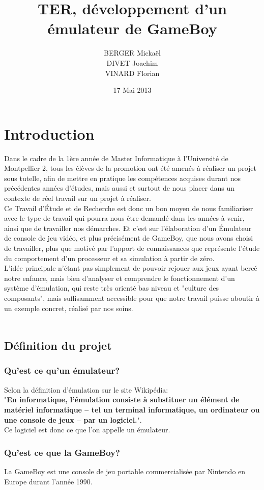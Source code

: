\documentclass{report}
\title{TER, développement d'un émulateur de GameBoy}
\author{BERGER Mickaël \\ DIVET Joachim \\ VINARD Florian}
\date{17 Mai 2013}
\begin{document}
\maketitle
\tableofcontents
\chapter{Introduction}
	Dans le cadre de la 1ère année de Master Informatique à l'Université de Montpellier
	2, tous les élèves de la promotion ont été amenés à réaliser un projet
	sous tutelle, afin de mettre en pratique les compétences acquises
	durant nos précédentes années d'études, mais aussi et surtout de nous
	placer dans un contexte de réel travail sur un projet à réaliser.\\
	Ce Travail d'Étude et de Recherche est donc un bon moyen de nous
	familiariser avec le type de travail qui pourra nous être demandé dans
	les années à venir, ainsi que de travailler nos démarches.
	Et c'est sur l'élaboration d'un Émulateur de console de jeu vidéo, et plus précisément de GameBoy,
	que nous avons choisi de travailler, plus que motivé par l'apport de
	connaissances que représente l'étude du comportement d'un processeur
	et sa simulation à partir de zéro.
	\\
	L'idée principale n'étant pas simplement de pouvoir rejouer aux jeux
	ayant bercé notre enfance, mais bien d'analyser et comprendre le
	fonctionnement d'un système d'émulation, qui reste très orienté bas
	niveau et "culture des composants", mais suffisamment accessible pour
	que notre travail puisse aboutir à un exemple concret, réalisé par nos
	soins.\\
	\\

\section{Définition du projet}
\subsection{Qu'est ce qu'un émulateur?}
	Selon la définition d'émulation sur le site Wikipédia:\\"\textbf{En informatique, l'émulation consiste à substituer un élément de matériel informatique – tel un terminal informatique, un ordinateur ou une console de jeux – par un logiciel.}".\\Ce logiciel est donc ce que l'on appelle un émulateur.
\subsection{Qu'est ce que la GameBoy?}
	La GameBoy est une console de jeu portable commercialisée par Nintendo en Europe durant l'année 1990.
\end{document}
